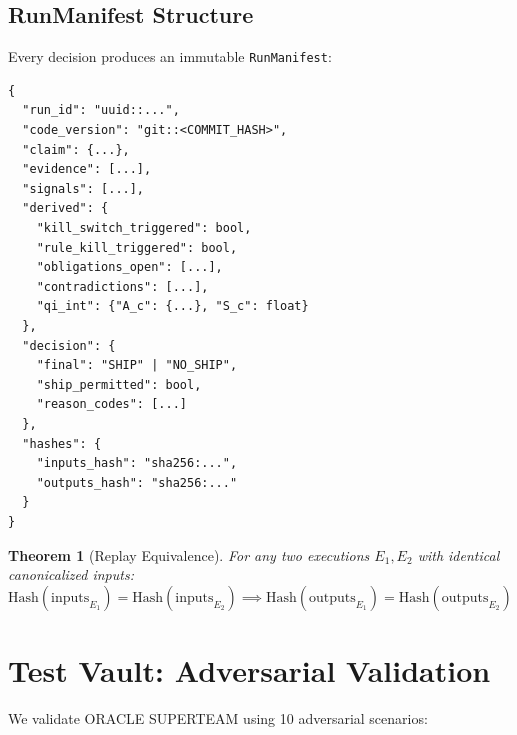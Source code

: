 \documentclass[11pt, letterpaper]{article}
\newtheorem{theorem}{Theorem}
\begin{document}
\subsection{RunManifest Structure}

Every decision produces an immutable \texttt{RunManifest}:

\begin{lstlisting}[caption=RunManifest schema]
{
  "run_id": "uuid::...",
  "code_version": "git::<COMMIT_HASH>",
  "claim": {...},
  "evidence": [...],
  "signals": [...],
  "derived": {
    "kill_switch_triggered": bool,
    "rule_kill_triggered": bool,
    "obligations_open": [...],
    "contradictions": [...],
    "qi_int": {"A_c": {...}, "S_c": float}
  },
  "decision": {
    "final": "SHIP" | "NO_SHIP",
    "ship_permitted": bool,
    "reason_codes": [...]
  },
  "hashes": {
    "inputs_hash": "sha256:...",
    "outputs_hash": "sha256:..."
  }
}
\end{lstlisting}

\begin{theorem}[Replay Equivalence]
For any two executions $E_1, E_2$ with identical canonicalized inputs:
\[
\text{Hash}(\text{inputs}_{E_1}) = \text{Hash}(\text{inputs}_{E_2}) \implies \text{Hash}(\text{outputs}_{E_1}) = \text{Hash}(\text{outputs}_{E_2})
\]
\end{theorem}

\section{Test Vault: Adversarial Validation}

We validate ORACLE SUPERTEAM using 10 adversarial scenarios:
\end{document}
